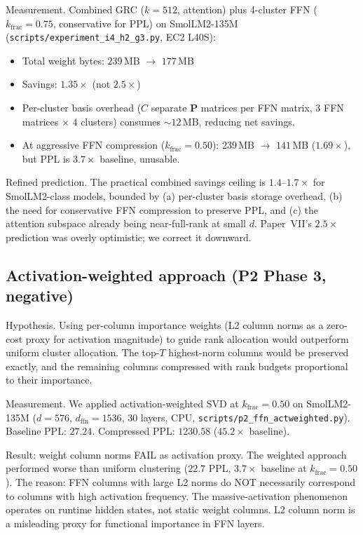 \documentclass[11pt]{article}
\providecommand{\Pmat}{\mathbf{P}}
\begin{document}
Measurement.  Combined GRC ($k{=}512$, attention) plus 4-cluster
FFN ($k_\text{frac}{=}0.75$, conservative for PPL) on SmolLM2-135M
(\texttt{scripts/experiment\_i4\_h2\_g3.py}, EC2 L40S):
\begin{itemize}
\item Total weight bytes: $239$\,MB $\to$ $177$\,MB
\item Savings: $1.35{\times}$ (not $2.5{\times}$)
\item Per-cluster basis overhead ($C$ separate $\Pmat$ matrices per FFN
      matrix, $3$ FFN matrices $\times$ $4$ clusters) consumes
      ${\sim}12$\,MB, reducing net savings.
\item At aggressive FFN compression ($k_\text{frac}{=}0.50$):
      $239$\,MB $\to$ $141$\,MB ($1.69{\times}$), but PPL is
      $3.7{\times}$ baseline, unusable.
\end{itemize}

Refined prediction.  The practical combined savings ceiling is
$1.4$--$1.7{\times}$ for SmolLM2-class models, bounded by (a) per-cluster
basis storage overhead, (b) the need for conservative FFN compression to
preserve PPL, and (c) the attention subspace already being near-full-rank
at small $d$.  Paper~VII's $2.5{\times}$ prediction was overly
optimistic; we correct it downward.

\subsection{Activation-weighted approach (P2 Phase 3, negative)}
\label{sec:p2-negative}

Hypothesis.  Using per-column importance weights (L2 column norms
as a zero-cost proxy for activation magnitude) to guide rank allocation
would outperform uniform cluster allocation.  The top-$T$ highest-norm
columns would be preserved exactly, and the remaining columns compressed
with rank budgets proportional to their importance.

Measurement.  We applied activation-weighted SVD at
$k_\text{frac}{=}0.50$ on SmolLM2-135M ($d{=}576$, $d_\text{ffn}{=}1536$,
30 layers, CPU, \texttt{scripts/p2\_ffn\_actweighted.py}).
Baseline PPL: $27.24$.  Compressed PPL: $1230.58$
($45.2{\times}$ baseline).

Result: weight column norms FAIL as activation proxy.
The weighted approach performed worse than uniform clustering
($22.7$ PPL, $3.7{\times}$ baseline at $k_\text{frac}{=}0.50$).
The reason: FFN columns with large L2 norms do NOT necessarily correspond
to columns with high activation frequency.  The massive-activation
phenomenon~\cite{sun2024massive} operates on runtime hidden states, not
static weight columns.  L2 column norm is a misleading proxy for functional
importance in FFN layers.
\end{document}
